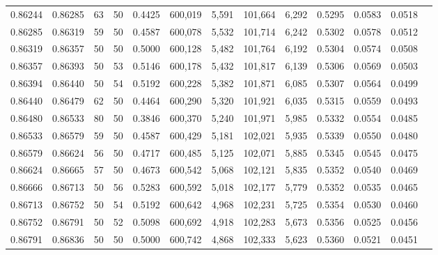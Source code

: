 \begin{tabular}{rrrrrrrrrrrrr}
0.86244 & 0.86285 &    63 &  50 &                                     0.4425 & 600,019 &   5,591 & 101,664 &   6,292 & 0.5295 & 0.0583 & 0.0518 \\
0.86285 & 0.86319 &    59 &  50 &                                     0.4587 & 600,078 &   5,532 & 101,714 &   6,242 & 0.5302 & 0.0578 & 0.0512 \\
0.86319 & 0.86357 &    50 &  50 &                                     0.5000 & 600,128 &   5,482 & 101,764 &   6,192 & 0.5304 & 0.0574 & 0.0508 \\
0.86357 & 0.86393 &    50 &  53 &                                     0.5146 & 600,178 &   5,432 & 101,817 &   6,139 & 0.5306 & 0.0569 & 0.0503 \\
0.86394 & 0.86440 &    50 &  54 &                                     0.5192 & 600,228 &   5,382 & 101,871 &   6,085 & 0.5307 & 0.0564 & 0.0499 \\
0.86440 & 0.86479 &    62 &  50 &                                     0.4464 & 600,290 &   5,320 & 101,921 &   6,035 & 0.5315 & 0.0559 & 0.0493 \\
0.86480 & 0.86533 &    80 &  50 &                                     0.3846 & 600,370 &   5,240 & 101,971 &   5,985 & 0.5332 & 0.0554 & 0.0485 \\
0.86533 & 0.86579 &    59 &  50 &                                     0.4587 & 600,429 &   5,181 & 102,021 &   5,935 & 0.5339 & 0.0550 & 0.0480 \\
0.86579 & 0.86624 &    56 &  50 &                                     0.4717 & 600,485 &   5,125 & 102,071 &   5,885 & 0.5345 & 0.0545 & 0.0475 \\
0.86624 & 0.86665 &    57 &  50 &                                     0.4673 & 600,542 &   5,068 & 102,121 &   5,835 & 0.5352 & 0.0540 & 0.0469 \\
0.86666 & 0.86713 &    50 &  56 &                                     0.5283 & 600,592 &   5,018 & 102,177 &   5,779 & 0.5352 & 0.0535 & 0.0465 \\
0.86713 & 0.86752 &    50 &  54 &                                     0.5192 & 600,642 &   4,968 & 102,231 &   5,725 & 0.5354 & 0.0530 & 0.0460 \\
0.86752 & 0.86791 &    50 &  52 &                                     0.5098 & 600,692 &   4,918 & 102,283 &   5,673 & 0.5356 & 0.0525 & 0.0456 \\
0.86791 & 0.86836 &    50 &  50 &                                     0.5000 & 600,742 &   4,868 & 102,333 &   5,623 & 0.5360 & 0.0521 & 0.0451 \\

\end{tabular}
